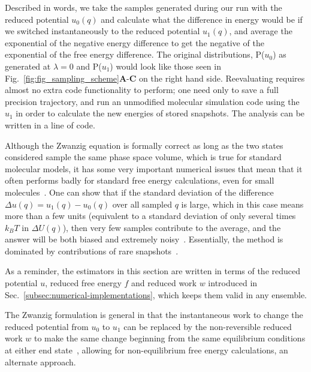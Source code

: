 Described in words, we take the samples generated during our run with the reduced potential $u_0(q)$ and calculate what the difference in energy would be if we switched instantaneously to the reduced potential $u_1(q)$, and average the exponential of the negative energy difference to get the negative of the exponential of the free energy difference. The original distributions, P($u_0$) as generated at $\lambda=0$ and P($u_1$) would look like those seen in Fig.~\ref{fig:fig_sampling_scheme}\textbf{A}-\textbf{C} on the right hand side. Reevaluating requires almost no extra code functionality to perform; one need only to save a full precision trajectory, and run an unmodified molecular simulation code using the $u_1$ in order to calculate the new energies of stored snapshots. The analysis can be written in a line of code.

Although the Zwanzig equation is formally correct as long as the two states considered sample the same phase space volume, which is true for standard molecular models, it has some very important numerical issues that mean that it often performs badly for standard free energy calculations, even for small molecules~\cite{shirts2005comparison,lu2003appropriate}. One can show that if the standard deviation of the difference $\Delta u(q) = u_1(q)-u_0(q)$ over all sampled $q$ is large, which in this case means more than a few units (equivalent to a standard deviation of only several times $k_BT$ in $\Delta U(q)$), then very few samples contribute to the average, and the answer will be both biased and extremely noisy~\cite{lelievre2010free}. Essentially, the method is dominated by contributions of rare snapshots~\cite{jarzynski2006rare, wu2005phasespace, wu2005phasespacea}. 

 As a reminder, the estimators in this section are written in terms of the reduced potential $u$, reduced free energy $f$ and reduced work $w$ introduced in Sec.~\ref{subsec:numerical-implementations}, which keeps them valid in any ensemble.
 
The Zwanzig formulation is general in that the instantaneous work to change the reduced potential from $u_0$ to $u_1$ can be replaced by the non-reversible reduced work $w$ to make the same change beginning from the same equilibrium conditions at either end state~\cite{jarzynski1997nonequilibrium,jarzynski1998equilibrium,crooks2000pathensemble}, allowing for non-equilibrium free energy calculations, an alternate approach. 

